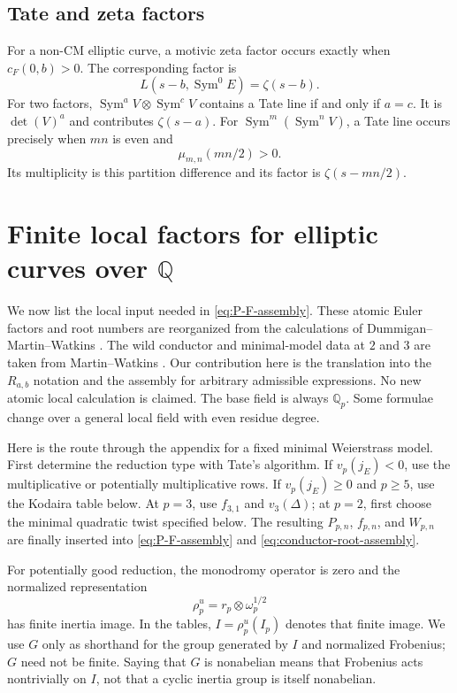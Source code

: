 \documentclass[11pt,reqno]{amsart}
\theoremstyle{definition}
\theoremstyle{remark}
\newcommand{\Q}{\mathbb Q}
\newcommand{\Sym}{\operatorname{Sym}}
\begin{document}
\subsection{Tate and zeta factors}

For a non-CM elliptic curve, a motivic zeta factor occurs exactly when
$c_F(0,b)>0$.  The corresponding factor is
\begin{equation}\label{eq:zeta-factor}
 L(s-b,\Sym^0E)=\zeta(s-b).
\end{equation}
For two factors, $\Sym^aV\otimes\Sym^cV$ contains a Tate line if and only if
$a=c$.  It is $\det(V)^a$ and contributes $\zeta(s-a)$.  For
$\Sym^m(\Sym^nV)$, a Tate line occurs precisely when $mn$ is even and
\begin{equation*}
 \mu_{m,n}(mn/2)>0.
\end{equation*}
Its multiplicity is this partition difference and its factor is
$\zeta(s-mn/2)$.

\section{Finite local factors for elliptic curves over \texorpdfstring{$\Q$}{Q}}
\label{app:local}

We now list the local input needed in \eqref{eq:P-F-assembly}.  These atomic
Euler factors and root numbers are reorganized from the calculations of
Dummigan--Martin--Watkins \cite{DMW}.  The wild conductor and minimal-model
data at $2$ and $3$ are taken from Martin--Watkins
\cite{MartinWatkins}.  Our contribution here is the translation into the
$R_{a,b}$ notation and the assembly for arbitrary admissible expressions.
No new atomic local calculation is claimed.  The base field is always
$\Q_p$.  Some formulae change over a general local field with even residue
degree.

Here is the route through the appendix for a fixed minimal Weierstrass model.
First determine the reduction type with Tate's algorithm.  If
$v_p(j_E)<0$, use the multiplicative or potentially multiplicative rows.  If
$v_p(j_E)\geq0$ and $p\geq5$, use the Kodaira table below.  At $p=3$, use
$f_{3,1}$ and $v_3(\Delta)$; at $p=2$, first choose the minimal quadratic
twist specified below.  The resulting $P_{p,n}$, $f_{p,n}$, and $W_{p,n}$
are finally inserted into \eqref{eq:P-F-assembly} and
\eqref{eq:conductor-root-assembly}.

For potentially good reduction, the monodromy operator is zero and the
normalized representation
\begin{equation}\label{eq:finite-WD-image}
 \rho_p^u=r_p\otimes\omega_p^{1/2}
\end{equation}
has finite inertia image.  In the tables, $I=\rho_p^u(I_p)$ denotes that
finite image.  We use $G$ only as shorthand for the group generated by $I$
and normalized Frobenius; $G$ need not be finite.  Saying that $G$ is
nonabelian means that Frobenius acts nontrivially on $I$, not that a cyclic
inertia group is itself nonabelian.
\end{document}
